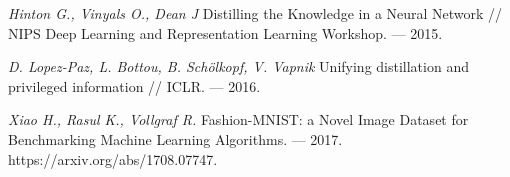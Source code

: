 \newpage


\begin{thebibliography}{99}
	\textit{Hinton G., Vinyals O., Dean J} Distilling the Knowledge in a Neural Network // NIPS Deep Learning and Representation Learning Workshop. — 2015.
    
    \textit{D. Lopez-Paz, L. Bottou, B. Schölkopf, V. Vapnik} Unifying distillation and privileged information // ICLR. — 2016.
    
    \textit{Xiao H., Rasul K., Vollgraf R.} Fashion-MNIST: a Novel Image Dataset for
    Benchmarking Machine Learning Algorithms. — 2017. https://arxiv.org/abs/1708.07747.
	
	
\end{thebibliography}
